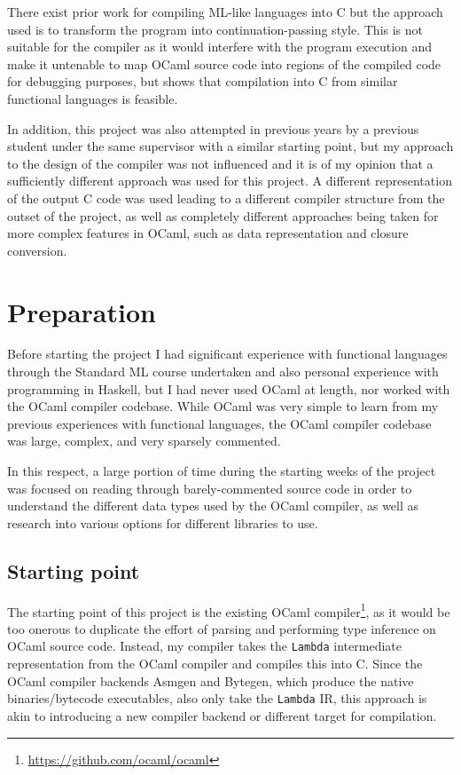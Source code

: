 There exist prior work for compiling ML-like languages into C
\cite{noassemblyrequired} but the approach used is to transform the program into
continuation-passing style. This is not suitable for the compiler as it would
interfere with the program execution and make it untenable to map OCaml source
code into regions of the compiled code for debugging purposes, but shows that
compilation into C from similar functional languages is feasible.

In addition, this project was also attempted in previous years by a previous
student \cite{previousproject} under the same supervisor with a similar starting
point, but my approach to the design of the compiler was not influenced and it
is of my opinion that a sufficiently different approach was used for this
project. A different representation of the output C code was used leading to a
different compiler structure from the outset of the project, as well as
completely different approaches being taken for more complex features in OCaml,
such as data representation and closure conversion.

\chapter{Preparation}

Before starting the project I had significant experience with functional
languages through the Standard ML course undertaken and also personal experience
with programming in Haskell, but I had never used OCaml at length, nor worked
with the OCaml compiler codebase. While OCaml was very simple to learn from my
previous experiences with functional languages, the OCaml compiler codebase was
large, complex, and very sparsely commented.

In this respect, a large portion of time during the starting weeks of the 
project was focused on reading through barely-commented source code in order to
understand the different data types used by the OCaml compiler, as well as
research into various options for different libraries to use.

\section{Starting point}

The starting point of this project is the existing OCaml
compiler\footnote{\url{https://github.com/ocaml/ocaml}}, as it would be too
onerous to duplicate the effort of parsing and performing type inference on
OCaml source code. Instead, my compiler takes the \texttt{Lambda} intermediate
representation from the OCaml compiler and compiles this into C. Since the OCaml
compiler backends Asmgen and Bytegen, which produce the native binaries/bytecode
executables, also only take the \texttt{Lambda} IR, this approach is akin to
introducing a new compiler backend or different target for compilation.


